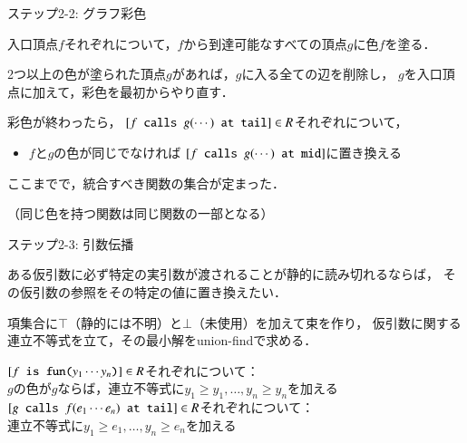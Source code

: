 \documentclass[aspectratio=169,t,dvipdfmx,12pt]{beamer}
\newcommand\codestyle{%
  \ttfamily
  \chardef\{=`\{
  \chardef\}=`\}
  \chardef\_=`\_
  \chardef\~=`\~
  \chardef\/=`\\
  \frenchspacing}
\newcommand\code[1]{\texttt{\protect\codestyle #1}}
\begin{document}
\begin{frame}{ステップ2-2: グラフ彩色}

入口頂点$f$それぞれについて，$f$から到達可能なすべての頂点$g$に色$f$を塗る．

\bigskip

2つ以上の色が塗られた頂点$g$があれば，$g$に入る全ての辺を削除し，
$g$を入口頂点に加えて，彩色を最初からやり直す．

\bigskip

彩色が終わったら，
$[\code{$f$ calls $g(\cdots)$ at tail}]\in R$それぞれについて，
\begin{itemize}
\item $f$と$g$の色が同じでなければ
$[\code{$f$ calls $g(\cdots)$ at mid}]$に置き換える
\end{itemize}

\bigskip

ここまでで，統合すべき関数の集合が定まった．

（同じ色を持つ関数は同じ関数の一部となる）

\end{frame}

\begin{frame}{ステップ2-3: 引数伝播}

ある仮引数に必ず特定の実引数が渡されることが静的に読み切れるならば，
その仮引数の参照をその特定の値に置き換えたい．

\bigskip

項集合に$\top$（静的には不明）と$\bot$（未使用）を加えて束を作り，
仮引数に関する連立不等式を立て，その最小解をunion-findで求める．

\medskip

\begin{tabbing}
$[\code{$f$ is fun($y_1\cdots y_n$)}] \in R$それぞれについて：\\
\qquad
$g$の色が$g$ならば，連立不等式に$y_1\ge y_1, \ldots, y_n\ge y_n$を加える\\
\qquad
$[\code{$g$ calls $f(e_1\cdots e_n)$ at tail}] \in R$それぞれについて：\\
\qquad\qquad
連立不等式に$y_1\ge e_1, \ldots, y_n\ge e_n$を加える
\end{tabbing}

\end{frame}
\end{document}
